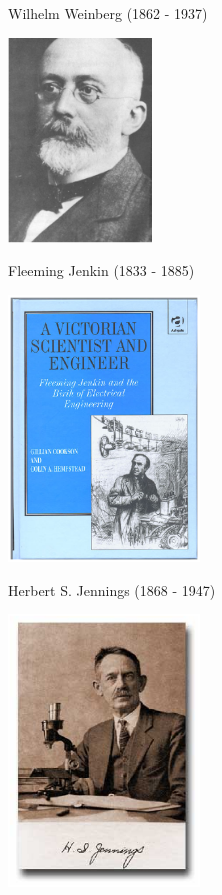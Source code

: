\documentclass[bluish,slideColor,colorBG,pdf]{prosper}
\begin{document}
\begin{slide}[Replace]{Wilhelm Weinberg (1862 - 1937) }
\bigskip

\centerline{\includegraphics[width=1.5in]{weinberg.ps}}

\end{slide}

\begin{slide}[Replace]{Fleeming Jenkin (1833 - 1885) }

\centerline{\includegraphics[width=2.0in]{jenkin1.ps}}

\end{slide}

\begin{slide}[Replace]{Herbert S. Jennings (1868 - 1947) }
\bigskip

\centerline{\includegraphics[width=2.0in]{jennings.ps}}

\end{slide}
\end{document}
